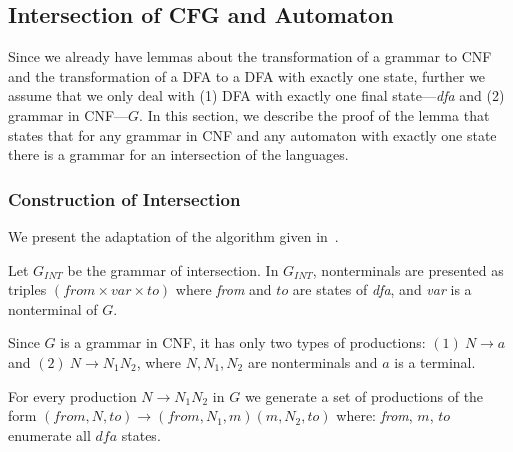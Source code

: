 \subsection{Intersection of CFG and Automaton}

Since we already have lemmas about the transformation of a grammar to CNF and the transformation of a DFA to a DFA with exactly one state, further we assume that we only deal with (1) DFA with exactly one final state---\textit{dfa} and (2) grammar in CNF---$G$. In this section, we describe the proof of the lemma that states that for any grammar in CNF and any automaton with exactly one state there is a grammar for an intersection of the languages.

\subsubsection{Construction of Intersection}

We present the adaptation of the algorithm given in~\cite{beigelproof}.

Let $G_{INT}$ be the grammar of intersection. In $G_{INT}$, nonterminals are presented as triples $(\textit{from} \times var \times to) $ where \textit{from} and $to$ are states of \textit{dfa}, and \textit{var} is a nonterminal of $G$.

Since $G$ is a grammar in CNF, it has only two types of productions: $(1)\ N \to a $ and $(2) \ N \to N_{1} N_{2}$, where $N, N_1, N_2$ are nonterminals and $a$ is a terminal.

For every production $N \to N_1 N_2$ in $G$ we generate a set of productions of the form $(\textit{from}, N, to) \to (\textit{from}, N_1,  m) (m, N_2, to)$ where: \textit{from}, $m$, $to$ enumerate all $\textit{dfa}$ states.

%


